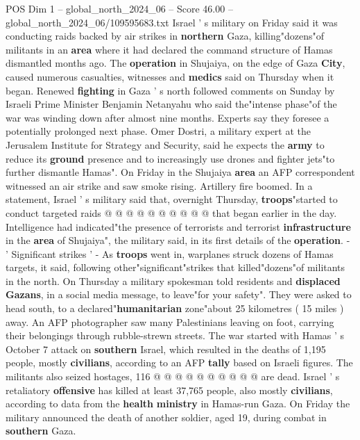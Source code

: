 \begin{textsample}{POS Dim 1 – global\_north\_2024\_06 – Score 46.00 – global\_north\_2024\_06/109595683.txt}  \label{ex:f1_pos_231}
Israel ' s military on Friday said it was conducting raids backed by air strikes in \textbf{northern} Gaza, killing"dozens"of militants in an \textbf{area} where it had declared the command structure of Hamas dismantled months ago.
The \textbf{operation} in Shujaiya, on the edge of Gaza \textbf{City}, caused numerous casualties, witnesses and \textbf{medics} said on Thursday when it began.
Renewed \textbf{fighting} in Gaza ' s north followed comments on Sunday by Israeli Prime Minister Benjamin Netanyahu who said the"intense phase"of the war was winding down after almost nine months.
Experts say they foresee a potentially prolonged next phase.
Omer Dostri, a military expert at the Jerusalem Institute for Strategy and Security, said he expects the \textbf{army} to reduce its \textbf{ground} presence and to increasingly use drones and fighter jets"to further dismantle Hamas".
On Friday in the Shujaiya \textbf{area} an AFP correspondent witnessed an air strike and saw smoke rising.
Artillery fire boomed.
In a statement, Israel ' s military said that, overnight Thursday, \textbf{troops}"started to conduct targeted raids @ @ @ @ @ @ @ @ @ @ that began earlier in the day.
Intelligence had indicated"the presence of terrorists and terrorist \textbf{infrastructure} in the \textbf{area} of Shujaiya", the military said, in its first details of the \textbf{operation}. - ' Significant strikes ' - As \textbf{troops} went in, warplanes struck dozens of Hamas targets, it said, following other"significant"strikes that killed"dozens"of militants in the north.
On Thursday a military spokesman told residents and \textbf{displaced} \textbf{Gazans}, in a social media message, to leave"for your safety".
They were asked to head south, to a declared"\textbf{humanitarian} zone"about 25 kilometres ( 15 miles ) away.
An AFP photographer saw many Palestinians leaving on foot, carrying their belongings through rubble-strewn streets.
The war started with Hamas ' s October 7 attack on \textbf{southern} Israel, which resulted in the deaths of 1,195 people, mostly \textbf{civilians}, according to an AFP \textbf{tally} based on Israeli figures.
The militants also seized hostages, 116 @ @ @ @ @ @ @ @ @ @ are dead.
Israel ' s retaliatory \textbf{offensive} has killed at least 37,765 people, also mostly \textbf{civilians}, according to data from the \textbf{health} \textbf{ministry} in Hamas-run Gaza.
On Friday the military announced the death of another soldier, aged 19, during combat in \textbf{southern} Gaza.

\end{textsample}
